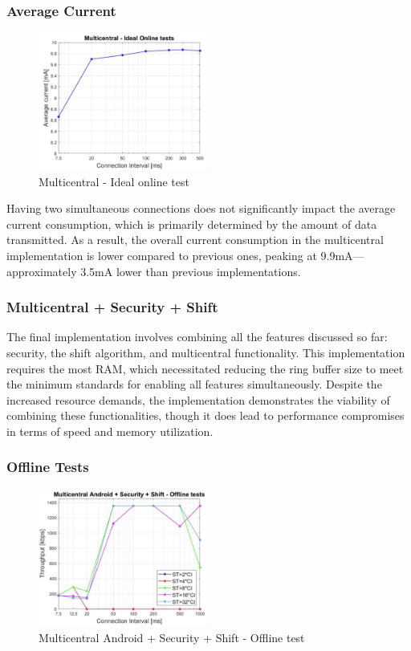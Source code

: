 \documentclass{Configuration_Files/PoliMi3i_thesis}
\begin{document}
\subsubsection*{Average Current}

\begin{figure}[H]
    \centering
    \includegraphics[width=0.5\textwidth]{Results Manuel/figure29}
    \caption{Multicentral - Ideal online test}
    \label{manuel_results_29}
\end{figure}

Having two simultaneous connections does not significantly impact the average current consumption, which is primarily determined by the amount of data transmitted. As a result, the overall current consumption in the multicentral implementation is lower compared to previous ones, peaking at 9.9mA—approximately 3.5mA lower than previous implementations.


\subsubsection*{Multicentral + Security + Shift}

The final implementation involves combining all the features discussed so far: security, the shift algorithm, and multicentral functionality. This implementation requires the most RAM, which necessitated reducing the ring buffer size to meet the minimum standards for enabling all features simultaneously. Despite the increased resource demands, the implementation demonstrates the viability of combining these functionalities, though it does lead to performance compromises in terms of speed and memory utilization.


\subsubsection*{Offline Tests}

\begin{figure}[H]
    \centering
    \includegraphics[width=0.5\textwidth]{Results Manuel/figure30}
    \caption{Multicentral Android + Security + Shift - Offline test}
    \label{manuel_results_30}
\end{figure}
\end{document}
